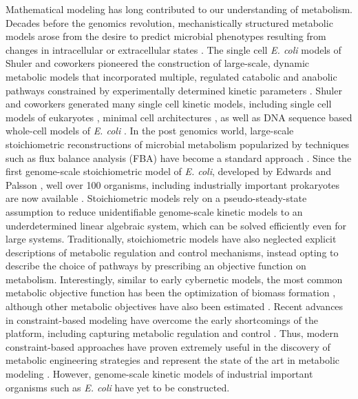 \documentclass[12pt]{article}
\begin{document}
Mathematical modeling has long contributed to our understanding of metabolism.
Decades before the genomics revolution, mechanistically structured metabolic models arose from the desire to predict microbial phenotypes resulting from changes in intracellular or extracellular states \citep{1976_fredrickson_BiotechBioeng}.
The single cell \textit{E. coli} models of Shuler and coworkers pioneered the construction of large-scale, dynamic metabolic models that incorporated multiple, regulated catabolic and anabolic pathways constrained by experimentally determined kinetic parameters \citep{1984_domach_shuler_BiotechBioeng_01}.
Shuler and coworkers generated many single cell kinetic models, including single cell models of eukaryotes \citep{1989_steinmeyer_shuler_ChemEngSci,1992_wu_shuler_AnnNYAcadSci}, minimal cell architectures \citep{2004_castellanos_shuler_PNAS}, as well as DNA sequence based whole-cell models of \textit{E. coli} \citep{2008_atlas_shuler_IETSysBio}.
In the post genomics world, large-scale stoichiometric reconstructions of microbial metabolism popularized by techniques such as flux balance analysis (FBA) have become a standard approach \citep{2012_lewis_palsson_NatRevMicrobio}.
Since the first genome-scale stoichiometric model of \textit{E. coli}, developed by Edwards and Palsson \citep{2000_edwards_palsson_PNAS}, well over 100 organisms, including industrially important prokaryotes are now available \citep{2009_feist_palsson_NatRevMicrobio,Feist:2007aa,Oh:2007aa}.
Stoichiometric models rely on a pseudo-steady-state assumption to reduce unidentifiable genome-scale kinetic models to an underdetermined linear algebraic system, which can be solved efficiently even for large systems.
Traditionally, stoichiometric models have also neglected explicit descriptions of metabolic regulation and control mechanisms, instead opting to describe the choice of pathways by prescribing an objective function on metabolism. Interestingly, similar to early cybernetic models, the most common metabolic objective function has been the optimization of biomass formation \citep{2002_ibarra_edwards_palsson_Nat}, although other metabolic objectives have also been estimated \citep{2007_schuetz_sauer_MolSysBio}.
Recent advances in constraint-based modeling have overcome the early shortcomings of the platform, including capturing metabolic regulation and control \citep{2013_hyduke_lewis_palsson_MolBioSys}.
Thus, modern constraint-based approaches have proven extremely useful in the discovery of metabolic engineering strategies and represent the state of the art in metabolic modeling \citep{2013_mccloskey_palsson_feist_MolSysBio, 2012_zomorrodi_maranas_MetaEng}.
However, genome-scale kinetic models of industrial important organisms such as \textit{E. coli} have yet to be constructed.
\end{document}
